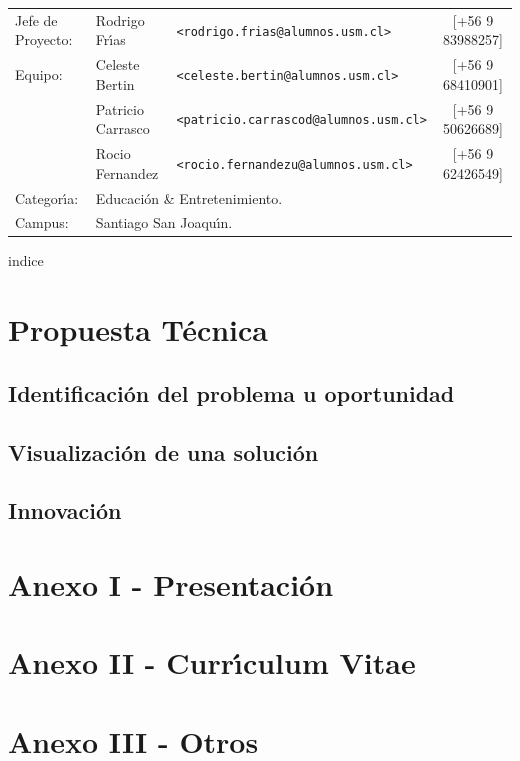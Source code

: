 \documentclass[letterpaper,11pt]{report} %
\numberwithin{equation}{section} %
\numberwithin{figure}{section} %
\numberwithin{table}{section} %
\begin{document}
\begin{titlepage}
\vfill
\begin{flushleft} %
\begin{table}[hb]
  \begin{tabular}{lllc}
    Jefe de Proyecto: & Rodrigo Fr\'{\i}as & \texttt{\small <rodrigo.frias@alumnos.usm.cl>} & [+56 9 83988257] \\
    Equipo: & Celeste Bertin & \texttt{\small <celeste.bertin@alumnos.usm.cl>} &[+56 9 68410901]\\
    & Patricio Carrasco &\texttt{\small <patricio.carrascod@alumnos.usm.cl>} &[+56 9 50626689]\\
    & Rocio Fernandez &\texttt{\small <rocio.fernandezu@alumnos.usm.cl>} &[+56 9 62426549]\\
    Categor\'{\i}a: & \multicolumn{3}{l}{Educaci\'on \& Entretenimiento.}\\
    Campus: & \multicolumn{3}{l}{Santiago San Joaqu\'{\i}n.}
  \end{tabular}
\end{table}
\end{flushleft}
\end{titlepage}


\setcounter{page}{1} %

\tableofcontents indice
\newpage

\chapter*{Propuesta T\'ecnica}
\newpage
\section{Identificaci\'on del problema u oportunidad}

\newpage
\section{Visualizaci\'on de una soluci\'on}

\newpage
\section{Innovaci\'on}

\newpage
\chapter*{Anexo I - Presentaci\'on} %

\newpage
\chapter*{Anexo II - Curr\'{\i}culum Vitae} %




\newpage
\chapter*{Anexo III - Otros} %
\end{document}
